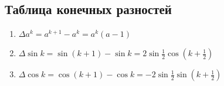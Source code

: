 \documentclass[a4paper,11pt]{article}
\begin{document}
  \subsection{Таблица конечных разностей}
  \begin{enumerate}
    \item \(\Delta a^k = a^{k+1} - a^k = a^k(a-1)\)
    \item \(\Delta \sin{k} = \sin{(k+1)} - \sin{k} = 2\sin{\frac{1}{2}}\cos{(k+\frac{1}{2})} \)
    \item \(\Delta \cos{k} = \cos{(k+1)} - \cos{k} = -2\sin{\frac{1}{2}}\sin{(k+\frac{1}{2})} \)
  \end{enumerate}
\newpage
\end{document}
